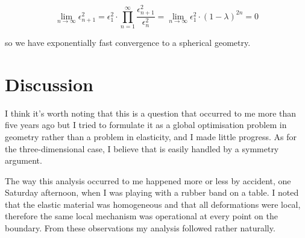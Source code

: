 \documentclass{article}
\begin{document}
\begin{equation}
\lim_{n \to \infty} \epsilon_{n+1}^2 = \epsilon_1^2 \cdot \prod_{n=1}^\infty \frac{\epsilon_{n+1}^2}{\epsilon_{n}^2} = \lim_{n \to \infty} \epsilon_1^2 \cdot (1-\lambda)^{2n} = 0
\end{equation}

so we have exponentially fast convergence to a spherical geometry.

\section{Discussion}

I think it's worth noting that this is a question that occurred to me more than five years ago but I tried to formulate it as a global optimisation problem in geometry rather than a problem in elasticity, and I made little progress. As for the three-dimensional case, I believe that is easily handled by a symmetry argument.

The way this analysis occurred to me happened more or less by accident, one Saturday afternoon, when I was playing with a rubber band on a table. I noted that the elastic material was homogeneous and that all deformations were local, therefore the same local mechanism was operational at every point on the boundary. From these observations my analysis followed rather naturally.
\end{document}
